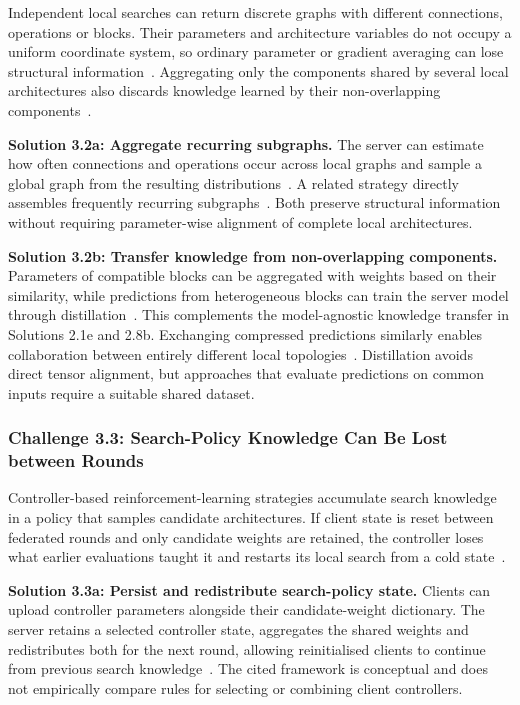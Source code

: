 Independent local searches can return discrete graphs with different connections, operations or blocks. Their parameters and architecture variables do not occupy a uniform coordinate system, so ordinary parameter or gradient averaging can lose structural information~\cite{multi-granular_fednas_2023,efnas_2024}. Aggregating only the components shared by several local architectures also discards knowledge learned by their non-overlapping components~\cite{f2nas_2024}.

\noindent\textbf{Solution 3.2a: Aggregate recurring subgraphs.} The server can estimate how often connections and operations occur across local graphs and sample a global graph from the resulting distributions~\cite{multi-granular_fednas_2023}. A related strategy directly assembles frequently recurring subgraphs~\cite{efnas_2024}. Both preserve structural information without requiring parameter-wise alignment of complete local architectures.

\noindent\textbf{Solution 3.2b: Transfer knowledge from non-overlapping components.} Parameters of compatible blocks can be aggregated with weights based on their similarity, while predictions from heterogeneous blocks can train the server model through distillation~\cite{f2nas_2024}. This complements the model-agnostic knowledge transfer in Solutions 2.1e and 2.8b. Exchanging compressed predictions similarly enables collaboration between entirely different local topologies~\cite{hetefed_2023}. Distillation avoids direct tensor alignment, but approaches that evaluate predictions on common inputs require a suitable shared dataset.

\subsubsection{Challenge 3.3: Search-Policy Knowledge Can Be Lost between Rounds}

Controller-based reinforcement-learning strategies accumulate search knowledge in a policy that samples candidate architectures. If client state is reset between federated rounds and only candidate weights are retained, the controller loses what earlier evaluations taught it and restarts its local search from a cold state~\cite{efficient_model_training_fednas_2024}.

\noindent\textbf{Solution 3.3a: Persist and redistribute search-policy state.} Clients can upload controller parameters alongside their candidate-weight dictionary. The server retains a selected controller state, aggregates the shared weights and redistributes both for the next round, allowing reinitialised clients to continue from previous search knowledge~\cite{efficient_model_training_fednas_2024}. The cited framework is conceptual and does not empirically compare rules for selecting or combining client controllers.

